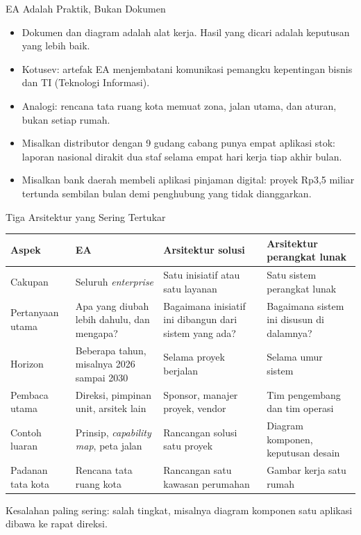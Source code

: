 \documentclass[aspectratio=169, table, 12pt]{beamer}
\begin{document}
\begin{frame}{{\Large EA Adalah Praktik, Bukan Dokumen}}
  \vspace{6pt}
  \small
  \begin{itemize}
    \item Dokumen dan diagram adalah alat kerja. Hasil yang dicari adalah keputusan yang lebih baik.
    \item Kotusev: artefak EA menjembatani komunikasi pemangku kepentingan bisnis dan TI (Teknologi
          Informasi).
    \item Analogi: rencana tata ruang kota memuat zona, jalan utama, dan aturan, bukan setiap rumah.
    \item Misalkan distributor dengan 9 gudang cabang punya empat aplikasi stok: laporan nasional
          dirakit dua staf selama empat hari kerja tiap akhir bulan.
    \item Misalkan bank daerah membeli aplikasi pinjaman digital: proyek Rp3,5 miliar tertunda
          sembilan bulan demi penghubung yang tidak dianggarkan.
  \end{itemize}
\end{frame}

\begin{frame}{{\Large Tiga Arsitektur yang Sering Tertukar}}
  \scriptsize
  \begin{tabularx}{\textwidth}{>{\raggedright\arraybackslash}p{1.9cm}
      >{\raggedright\arraybackslash}X >{\raggedright\arraybackslash}X
      >{\raggedright\arraybackslash}X}
    \hline
    \textbf{Aspek} & \textbf{EA} & \textbf{Arsitektur solusi} & \textbf{Arsitektur perangkat lunak} \\
    \hline
    Cakupan & Seluruh \textit{enterprise} & Satu inisiatif atau satu layanan & Satu sistem perangkat lunak \\
    \hline
    Pertanyaan utama & Apa yang diubah lebih dahulu, dan mengapa? & Bagaimana inisiatif ini dibangun dari sistem yang ada? & Bagaimana sistem ini disusun di dalamnya? \\
    \hline
    Horizon & Beberapa tahun, misalnya 2026 sampai 2030 & Selama proyek berjalan & Selama umur sistem \\
    \hline
    Pembaca utama & Direksi, pimpinan unit, arsitek lain & Sponsor, manajer proyek, vendor & Tim pengembang dan tim operasi \\
    \hline
    Contoh luaran & Prinsip, \textit{capability map}, peta jalan & Rancangan solusi satu proyek & Diagram komponen, keputusan desain \\
    \hline
    Padanan tata kota & Rencana tata ruang kota & Rancangan satu kawasan perumahan & Gambar kerja satu rumah \\
    \hline
  \end{tabularx}

  \vspace{6pt}
  \small Kesalahan paling sering: salah tingkat, misalnya diagram komponen satu aplikasi dibawa ke
  rapat direksi.
\end{frame}
\end{document}
